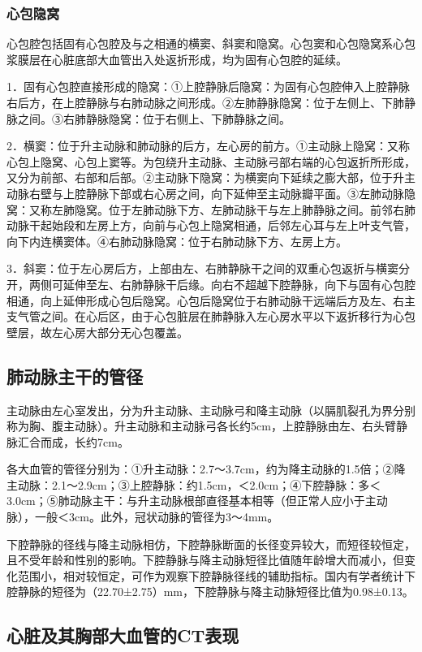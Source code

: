 \subsubsection{心包隐窝}

心包腔包括固有心包腔及与之相通的横窦、斜窦和隐窝。心包窦和心包隐窝系心包浆膜层在心脏底部大血管出入处返折形成，均为固有心包腔的延续。

1．固有心包腔直接形成的隐窝：①上腔静脉后隐窝：为固有心包腔伸入上腔静脉右后方，在上腔静脉与右肺动脉之间形成。②左肺静脉隐窝：位于左侧上、下肺静脉之间。③右肺静脉隐窝：位于右侧上、下肺静脉之间。

2．横窦：位于升主动脉和肺动脉的后方，左心房的前方。①主动脉上隐窝：又称心包上隐窝、心包上窦等。为包绕升主动脉、主动脉弓部右端的心包返折所形成，又分为前部、右部和后部。②主动脉下隐窝：为横窦向下延续之膨大部，位于升主动脉右壁与上腔静脉下部或右心房之间，向下延伸至主动脉瓣平面。③左肺动脉隐窝：又称左肺隐窝。位于左肺动脉下方、左肺动脉干与左上肺静脉之间。前邻右肺动脉干起始段和左房上方，向前与心包上隐窝相通，后邻左心耳与左上叶支气管，向下内连横窦体。④右肺动脉隐窝：位于右肺动脉下方、左房上方。

3．斜窦：位于左心房后方，上部由左、右肺静脉干之间的双重心包返折与横窦分开，两侧可延伸至左、右肺静脉干后缘。向右不超越下腔静脉，向下与固有心包腔相通，向上延伸形成心包后隐窝。心包后隐窝位于右肺动脉干远端后方及左、右主支气管之间。在心后区，由于心包脏层在肺静脉入左心房水平以下返折移行为心包壁层，故左心房大部分无心包覆盖。

\subsection{肺动脉主干的管径}

主动脉由左心室发出，分为升主动脉、主动脉弓和降主动脉（以膈肌裂孔为界分别称为胸、腹主动脉）。升主动脉和主动脉弓各长约5cm，上腔静脉由左、右头臂静脉汇合而成，长约7cm。

各大血管的管径分别为：①升主动脉：2.7～3.7cm，约为降主动脉的1.5倍；②降主动脉：2.1～2.9cm；③上腔静脉：约1.5cm，＜2.0cm；④下腔静脉：多＜3.0cm；⑤肺动脉主干：与升主动脉根部直径基本相等（但正常人应小于主动脉），一般＜3cm。此外，冠状动脉的管径为3～4mm。

下腔静脉的径线与降主动脉相仿，下腔静脉断面的长径变异较大，而短径较恒定，且不受年龄和性别的影响。下腔静脉与降主动脉短径比值随年龄增大而减小，但变化范围小，相对较恒定，可作为观察下腔静脉径线的辅助指标。国内有学者统计下腔静脉的短径为（22.70±2.75）mm，下腔静脉与降主动脉短径比值为0.98±0.13。

\subsection{心脏及其胸部大血管的CT表现}

